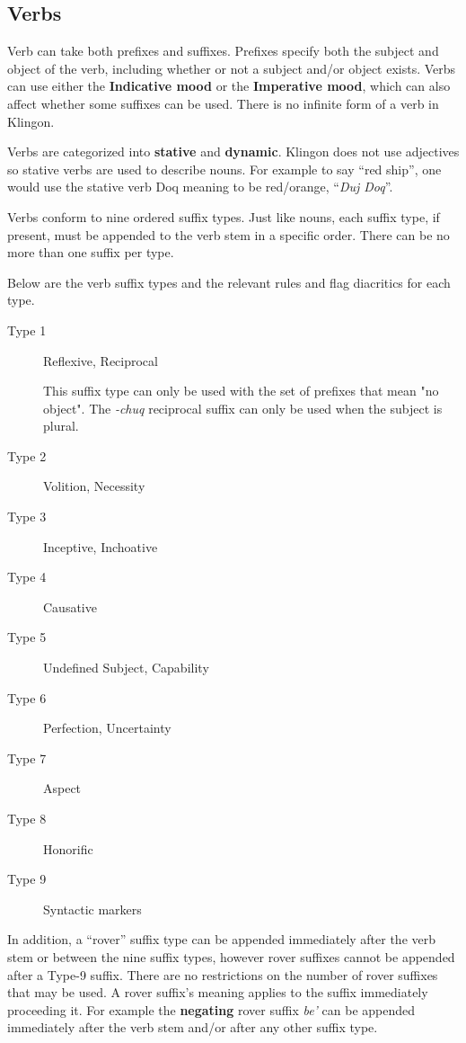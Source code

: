 \documentclass[11pt]{article}
\begin{document}
\subsection {Verbs}

Verb can take both prefixes and suffixes. Prefixes specify both the subject and object of the verb, including whether or not a subject and/or object exists. Verbs can use either the \textbf{Indicative mood} or the \textbf{Imperative mood}, which can also affect whether some suffixes can be used. There is no infinite form of a verb in Klingon.

Verbs are categorized into \textbf{stative} and \textbf{dynamic}. Klingon does not use adjectives so stative verbs are used to describe nouns. For example to say ``red ship'', one would use the stative verb Doq meaning to be red/orange, ``\textit{Duj Doq}''.

Verbs conform to nine ordered suffix types. Just like nouns, each suffix type, if present, must be appended to the verb stem in a specific order. There can be no more than one suffix per type.

Below are the verb suffix types and the relevant rules and flag diacritics for each type.

\begin{description}
	\item[Type 1] Reflexive, Reciprocal
	
	This suffix type can only be used with the set of prefixes that mean "no object". The \textit{-chuq} reciprocal suffix can only be used when the subject is plural.
	
	\item[Type 2] Volition, Necessity
	\item[Type 3] Inceptive, Inchoative
	\item[Type 4] Causative
	\item[Type 5] Undefined Subject, Capability
	\item[Type 6] Perfection, Uncertainty
	\item[Type 7] Aspect
	\item[Type 8] Honorific
	\item[Type 9] Syntactic markers
\end{description}

In addition, a ``rover'' suffix type can be appended immediately after the verb stem or between the nine suffix types, however rover suffixes cannot be appended after a Type-9 suffix. There are no restrictions on the number of rover suffixes that may be used. A rover suffix's meaning applies to the suffix immediately proceeding it. For example the \textbf{negating} rover suffix \textit{be'} can be appended immediately after the verb stem and/or after any other suffix type.
\end{document}
